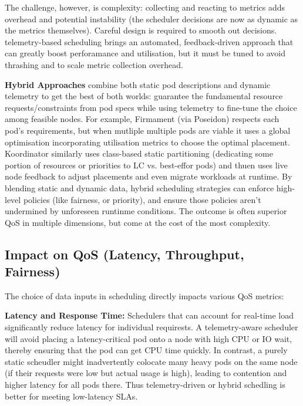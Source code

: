 The challenge, however, is complexity: collecting and reacting to metrics adds
overhead and potential instability (the scheduler decisions are now as dynamic
as the metrics themselves). Careful design is required to smooth out decisions.
telemetry-based scheduling brings an automated, feedback-driven approach that
can greatly boost perforamance and utilisation, but it must be tuned to avoid
thrashing and to scale metric collection overhead.

\textbf{Hybrid Approaches} combine both static pod descriptions and dynamic
telemetry to get the best of both worlds: guarantee the fundamental resource
requests/constraints from pod specs while using telemetry to fine-tune the
choice among feasible nodes. For example, Firmament (via Poseidon) \cite{}
respects each pod's requirements, but when mutliple multiple pods are viable it
uses a global optimisation incorporating utilisation metrics to choose the
optimal placement. Koordinator \cite{} similarly uses class-based static
partitioning (dedicating some portion of resources or priorities to LC vs.
best-effor pods) and thuen uses live node feedback to adjust placements and even
migrate workloads at runtime. By blending static and dynamic data, hybrid
scheduling strategies can enforce high-level policies (like fairness, or
priority), and ensure those policies aren't undermined by unforeseen runtinme
conditions. The outcome is often superior QoS in multiple dimensions, but come
at the cost of the most complexity.

\subsection{Impact on QoS (Latency, Throughput, Fairness)}
The choice of data inputs in scheduling directly impacts various QoS metrics:

\textbf{Latency and Response Time:} Schedulers that can account for real-time
load significantly reduce latency for individual requirests. A telemetry-aware
scheduler will avoid placing a latency-critical pod onto a node with high CPU or
IO wait, thereby ensuring that the pod can get CPU time quickly. In contrast, a
purely static scheudler might inadvertently colocate many heavy pods on the same
node (if their requests were low but actual usage is high), leading to
contention and higher latency for all pods there. Thus telemetry-driven or
hybrid schedling is better for meeting low-latency SLAs.

